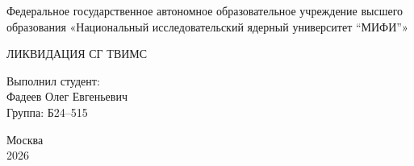 \begin{center}
	Федеральное государственное автономное образовательное учреждение высшего образования «Национальный исследовательский ядерный университет ``МИФИ''»
\end{center}

\vspace{5cm}

\begin{center}
	{ \Large ЛИКВИДАЦИЯ СГ ТВИМС \\ }
\end{center}

\vfill

\begin{flushright}
	Выполнил студент:\\
	Фадеев Олег Евгеньевич\\
	Группа: Б24--515
\end{flushright}

\vspace{0.3cm}

\begin{center}
	Москва\\
	2026
\end{center}

\thispagestyle{empty}
\newpage
